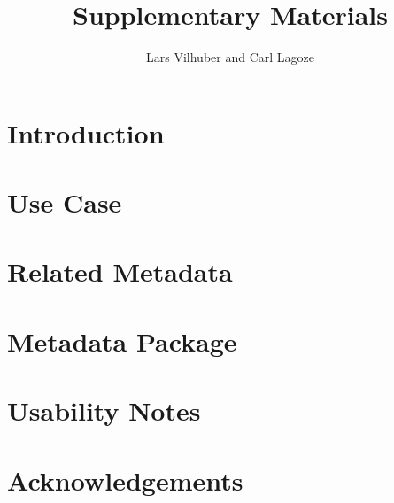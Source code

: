 \documentclass[10pt,letterpaper]{article}
\author{Lars Vilhuber and Carl Lagoze}
\title{Supplementary Materials}
\begin{document}
	
\begin{abstract}
	
\end{abstract}

\section{Introduction}
\label{sec:intro}


\section{Use Case}
\label{sec:usecase}


\section{Related Metadata}
\label{sec:related-metadata}


\section{Metadata Package}
\label{sec:metadata-package}


\section{Usability Notes}
\label{sec:usability}


\section{Acknowledgements}
\label{sec:ack}



%
%
\printbibliography
\end{document}
